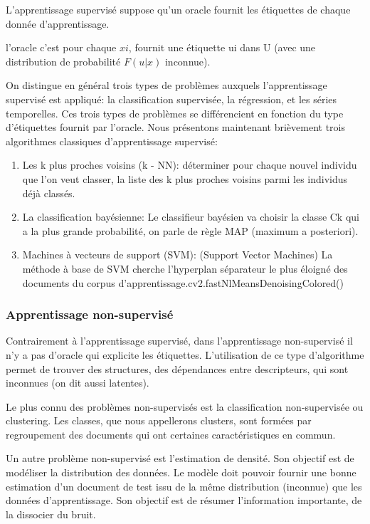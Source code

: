 \documentclass[12pt]{article}
\begin{document}
L'apprentissage supervisé suppose qu'un oracle fournit les étiquettes de chaque donnée d'apprentissage.

l’oracle c’est pour chaque $xi$, fournit une étiquette ui dans U (avec une distribution de probabilité $F(u|x)$ inconnue).

On distingue en général trois types de problèmes auxquels l'apprentissage supervisé est appliqué: la classification supervisée, la régression, et les séries temporelles. Ces trois types de problèmes se différencient en fonction du type d'étiquettes fournit par l'oracle.
Nous présentons maintenant brièvement trois algorithmes classiques d'apprentissage supervisé:
\begin{enumerate}
	\item Les k plus proches voisins (k - NN): déterminer pour chaque nouvel individu que l'on veut classer, la liste des k plus proches voisins parmi les individus déjà classés.
	\item La classification bayésienne: Le classifieur bayésien va choisir la classe Ck qui a la plus grande probabilité, on parle de règle MAP (maximum a posteriori).
	\item Machines à vecteurs de support (SVM): (Support Vector Machines) La méthode à base de SVM cherche l'hyperplan séparateur le plus éloigné des documents du corpus d'apprentissage.cv2.fastNlMeansDenoisingColored()
\end{enumerate}

\subsubsection{Apprentissage non-supervisé}
Contrairement à l'apprentissage supervisé, dans l'apprentissage non-supervisé il n'y a pas d'oracle qui explicite les étiquettes. L'utilisation de ce type d'algorithme permet de trouver des structures, des dépendances entre descripteurs, qui sont inconnues (on dit aussi latentes). 

Le plus connu des problèmes non-supervisés est la classification non-supervisée ou clustering. Les classes, que nous appellerons clusters, sont formées par regroupement des documents qui ont certaines caractéristiques en commun.

Un autre problème non-supervisé est l'estimation de densité. Son objectif est de modéliser la distribution des données. Le modèle doit pouvoir fournir une bonne estimation d'un document de test issu de la même distribution (inconnue) que les données d'apprentissage. Son objectif est de résumer l'information importante, de la dissocier du bruit.
\end{document}
